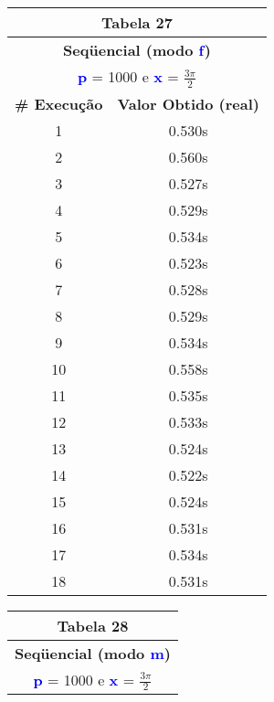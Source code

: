 \documentclass[11pt]{article}
\begin{document}
\begin{table}[!h]
	\begin{center}
		\begin{minipage}{0.48\textwidth}
			\begin{tabular}{| c | c |}
			\hline
			\multicolumn{2}{|c|}{\textbf{Tabela 27}} \\ \hline
			\multicolumn{2}{|c|}{\textbf{Seqüencial (modo \textbf{\textcolor{blue}{f}})}} \\
			\multicolumn{2}{|c|}{\textbf{\textcolor{blue}{p}} = 1000 e \textbf{\textcolor{blue}{x}} = $\frac{3\pi}{2}$} \\ [0.2ex]
			\hline
				\textbf{\# Execução} &  \textbf{Valor Obtido (real)} \\ \hline
				1 & 0.530s \\ \hline
				2 & 0.560s \\ \hline
				3 & 0.527s \\ \hline
				4 & 0.529s \\ \hline
				5 & 0.534s \\ \hline
				6 & 0.523s \\ \hline
				7 & 0.528s \\ \hline
				8 & 0.529s \\ \hline
				9 & 0.534s \\ \hline
				10 & 0.558s \\ \hline
				11 & 0.535s \\ \hline
				12 & 0.533s \\ \hline
				13 & 0.524s \\ \hline
				14 & 0.522s \\ \hline
				15 & 0.524s \\ \hline
				16 & 0.531s \\ \hline
				17 & 0.534s \\ \hline
				18 & 0.531s \\ \hline
			\end{tabular}
		\end{minipage}
		\begin{minipage}{0.48\textwidth}
			\begin{tabular}{| c | c |}
			\hline
			\multicolumn{2}{|c|}{\textbf{Tabela 28}} \\ \hline
			\multicolumn{2}{|c|}{\textbf{Seqüencial (modo \textbf{\textcolor{blue}{m}})}} \\
			\multicolumn{2}{|c|}{\textbf{\textcolor{blue}{p}} = 1000 e \textbf{\textcolor{blue}{x}} = $\frac{3\pi}{2}$} \\ [0.2ex]
			\hline

\end{tabular}
\end{minipage}
\end{center}
\end{table}
\end{document}
